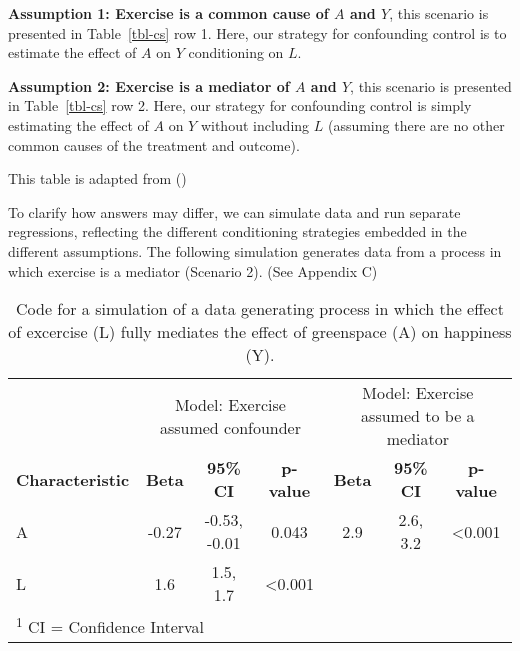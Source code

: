\documentclass[
  singlecolumn]{article}
\begin{document}
\textbf{Assumption 1: Exercise is a common cause of \(A\) and \(Y\)},
this scenario is presented in Table~\ref{tbl-cs} row 1. Here, our
strategy for confounding control is to estimate the effect of \(A\) on
\(Y\) conditioning on \(L\).

\textbf{Assumption 2: Exercise is a mediator of \(A\) and \(Y\)}, this
scenario is presented in Table~\ref{tbl-cs} row 2. Here, our strategy
for confounding control is simply estimating the effect of \(A\) on
\(Y\) without including \(L\) (assuming there are no other common causes
of the treatment and outcome).

\begin{table}

\caption{\label{tbl-cs}This table is adapted from
()}

\centering{

\examplecrosssection

}

\end{table}%

To clarify how answers may differ, we can simulate data and run separate
regressions, reflecting the different conditioning strategies embedded
in the different assumptions. The following simulation generates data
from a process in which exercise is a mediator (Scenario 2). (See
Appendix C)

\begin{table}
\caption{Code for a simulation of a data generating process in which the effect
of excercise (L) fully mediates the effect of greenspace (A) on
happiness (Y).}\tabularnewline

\centering
\begin{tabular}{lcccccc}
\toprule
\multicolumn{1}{c}{ } & \multicolumn{3}{c}{Model: Exercise assumed confounder} & \multicolumn{3}{c}{Model: Exercise assumed to be a mediator} \\
\cmidrule(l{3pt}r{3pt}){2-4} \cmidrule(l{3pt}r{3pt}){5-7}
\textbf{Characteristic} & \textbf{Beta} & \textbf{95\% CI} & \textbf{p-value} & \textbf{Beta} & \textbf{95\% CI} & \textbf{p-value}\\
\midrule
A & -0.27 & -0.53, -0.01 & 0.043 & 2.9 & 2.6, 3.2 & <0.001\\
L & 1.6 & 1.5, 1.7 & <0.001 &  &  & \\
\bottomrule
\multicolumn{7}{l}{\rule{0pt}{1em}\textsuperscript{1} CI = Confidence Interval}\\
\end{tabular}
\end{table}
\end{document}
